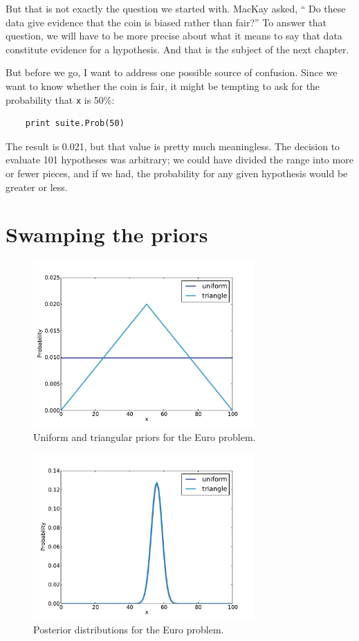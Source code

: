 \documentclass[12pt]{book}
\begin{document}
But that is not exactly the question we started with.  MacKay asked,
`` Do these data give evidence that the coin is biased rather than
fair?''  To answer that question, we will have to be more precise
about what it means to say that data constitute evidence for
a hypothesis.  And that is the subject of the next chapter.

But before we go, I want to address one possible source of confusion.
Since we want to know whether the coin is fair, it might be tempting
to ask for the probability that {\tt x} is 50\%:

\begin{verbatim}
    print suite.Prob(50)
\end{verbatim}

The result is 0.021, but that value is pretty much meaningless.  The
decision to evaluate 101 hypotheses was arbitrary; we could have
divided the range into more or fewer pieces, and if we had, the
probability for any given hypothesis would be greater or less.


\section{Swamping the priors}

\begin{figure}
\centerline{\includegraphics[height=2.5in]{figs/euro2.pdf}}
\caption{Uniform and triangular priors for the
Euro problem.}
\label{fig.euro2}
\end{figure}

\begin{figure}
\centerline{\includegraphics[height=2.5in]{figs/euro3.pdf}}
\caption{Posterior distributions for the Euro problem.}
\label{fig.euro3}
\end{figure}
\end{document}

